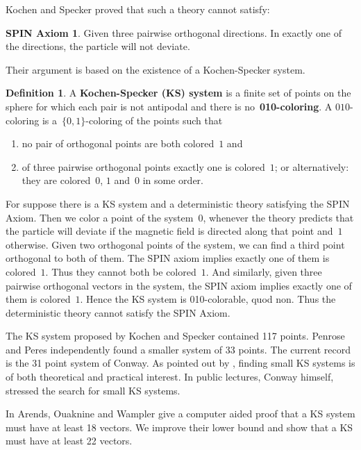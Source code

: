 \documentclass[a4paper]{article}
\newcommand{\keyword}[1]{\textbf{#1}}
\newcounter{main}
\theoremstyle{definition}
\newtheorem{dfn}[main]{Definition}
\newtheorem*{spin}{SPIN Axiom \cite{ck09}}
\theoremstyle{remark}
\begin{document}
Kochen and Specker proved that such a theory cannot satisfy:
\begin{spin}
    Given three pairwise orthogonal directions.
    In exactly one of the directions, the particle will not deviate.
\end{spin}
Their argument is based on the existence of a Kochen-Specker system.
\begin{dfn}
    A \keyword{Kochen-Specker (KS) system} is
    a finite set of points on the sphere
    for which each pair is not antipodal and
    there is no~\keyword{010-coloring}.
    A $010$-coloring is a~$\{0,1\}$-coloring of the points such that
    \begin{enumerate}
        \item
            no pair of orthogonal points are both colored~$1$ and
        \item
            of three pairwise orthogonal points exactly one is colored~$1$;
            or alternatively: they are colored~$0$, $1$ and~$0$ in some order.
    \end{enumerate}
\end{dfn}
For suppose there is a KS system and  a deterministic theory satisfying
the SPIN Axiom.
Then we color a point of the system~$0$,
whenever the theory predicts that the particle will deviate
if the magnetic field is directed along that point and~$1$ otherwise.
Given two orthogonal points of the system,
we can find a third point orthogonal to both of them.
The SPIN axiom implies exactly one of them is colored~$1$.
Thus they cannot both be colored~$1$.
And similarly, given three pairwise orthogonal vectors in the system,
the SPIN axiom implies exactly one of them is colored~$1$.
Hence the KS system is 010-colorable, quod non.  Thus the deterministic theory
cannot satisfy the SPIN Axiom.

The KS system proposed by Kochen and Specker contained 117 points\cite{ks}.
Penrose and Peres independently found a smaller system of 33 points.
The current record is the 31 point system of Conway.
As pointed out by \cite{c00,aow11}, finding small KS systems
is of both theoretical and practical interest.
In public lectures, Conway himself, stressed the search for small KS systems.

In \cite{aow11} Arends, Ouaknine and Wampler give a computer aided proof
that a KS system must have at least 18 vectors.  We improve their lower bound
and show that a KS must have at least 22 vectors.
\end{document}
